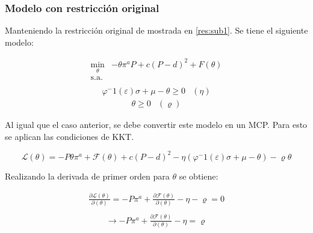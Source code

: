 \subsubsection{Modelo con restricción original}

Manteniendo la restricción original de  mostrada en \ref{res:sub1}. Se tiene el siguiente modelo:

\begin{equation}
\begin{array}{rrclcl}
   \displaystyle \min_{\theta} & -\theta \pi^aP + c(P-d)^2+F(\theta) \\\textrm{s.a.} \label{eq:perforconrestr}\\
\end{array}
\end{equation}
\begin{equation}
\begin{array}{cl}
    \varphi^-1 (\varepsilon )\sigma + \mu - \theta \geq 0 & (\eta)  \label{perforconrestr:r1}
\end{array}
\end{equation}
\begin{equation}
\begin{array}{cl}
    \theta \geq 0 & (\varrho)
\end{array}
\end{equation}

Al igual que el caso anterior, se debe convertir este modelo en un MCP. Para esto se aplican las condiciones de KKT.

$$\mathcal{L}(\theta)=-P\theta\pi^a+\mathcal{F}(\theta)+c(P-d)^2 -\eta(\varphi^-1 (\varepsilon )\sigma + \mu - \theta)- \varrho\theta $$

Realizando la derivada de primer orden para $\theta$ se obtiene:

\begin{equation}
\begin{array}{rrclcl}
    \frac{\partial\mathcal{L}(\theta)}{\partial (\theta)}=-P\pi^a+\frac{\partial\mathcal{F}(\theta)}{\partial(\theta)}-\eta -\varrho=0 \label{lag20}\\
\end{array}
\end{equation}
\begin{equation}
\begin{array}{rrclcl}
    \rightarrow -P\pi^a+\frac{\partial\mathcal{F}(\theta)}{\partial(\theta)}-\eta=\varrho \label{lag21}\\
\end{array}
\end{equation}

